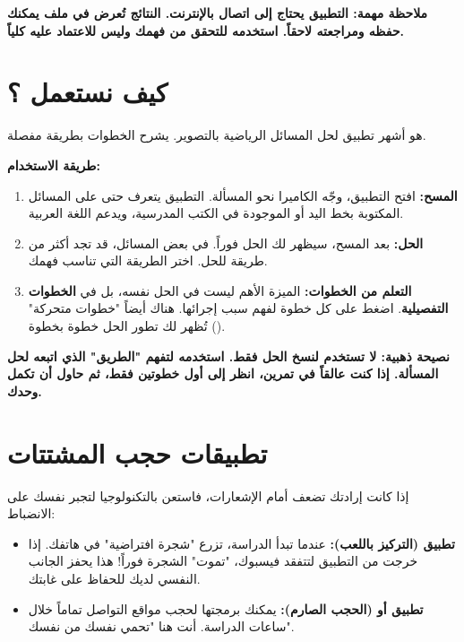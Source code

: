 \documentclass[12pt,a4paper]{book}
\newcommand{\importantAr}[1]{%
	\begin{important}
		\bfseries #1
	\end{important}
}
\begin{document}
\importantAr{ملاحظة مهمة: التطبيق يحتاج إلى اتصال بالإنترنت. النتائج تُعرض في ملف \LR{PDF} يمكنك حفظه ومراجعته لاحقاً. استخدمه للتحقق من فهمك وليس للاعتماد عليه كلياً.}

\section{كيف نستعمل ؟}

 هو أشهر تطبيق لحل المسائل الرياضية بالتصوير. يشرح الخطوات بطريقة مفصلة.

\textbf{طريقة الاستخدام:}

\begin{enumerate}
	\item \textbf{المسح:} افتح التطبيق، وجّه الكاميرا نحو المسألة. التطبيق يتعرف حتى على المسائل المكتوبة بخط اليد أو الموجودة في الكتب المدرسية، ويدعم اللغة العربية.
	\item \textbf{الحل:} بعد المسح، سيظهر لك الحل فوراً. في بعض المسائل، قد تجد أكثر من طريقة للحل. اختر الطريقة التي تناسب فهمك.
	\item \textbf{التعلم من الخطوات:} الميزة الأهم ليست في الحل نفسه، بل في \textbf{الخطوات التفصيلية}. اضغط على كل خطوة لفهم سبب إجرائها. هناك أيضاً "خطوات متحركة" () تُظهر لك تطور الحل خطوة بخطوة.
\end{enumerate}

\importantAr{نصيحة ذهبية: لا تستخدم  لنسخ الحل فقط. استخدمه لتفهم "الطريق" الذي اتبعه لحل المسألة. إذا كنت عالقاً في تمرين، انظر إلى أول خطوتين فقط، ثم حاول أن تكمل وحدك.}


\section{تطبيقات حجب المشتتات}

إذا كانت إرادتك تضعف أمام الإشعارات، فاستعن بالتكنولوجيا لتجبر نفسك على الانضباط:
\begin{itemize}
	\item \textbf{تطبيق  (التركيز باللعب):} عندما تبدأ الدراسة، تزرع "شجرة افتراضية" في هاتفك. إذا خرجت من التطبيق لتتفقد فيسبوك، "تموت" الشجرة فوراً! هذا يحفز الجانب النفسي لديك للحفاظ على غابتك.
	\item \textbf{تطبيق  أو  (الحجب الصارم):} يمكنك برمجتها لحجب مواقع التواصل تماماً خلال ساعات الدراسة. أنت هنا "تحمي نفسك من نفسك".
\end{itemize}
\end{document}
